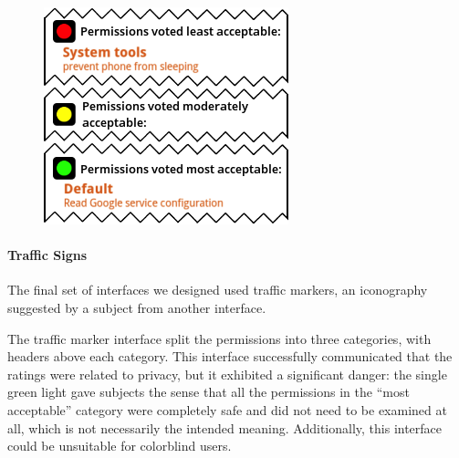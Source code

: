 \documentclass[11pt]{article}
\begin{document}
\newpage

\begin{figure}
\begin{center}
\includegraphics[width=.9\linewidth]{candidate-img/traffic/trafficR2.png}
\end{center}
\end{figure}

\paragraph{Traffic Signs}
\label{s-sec-traffic}

The final set of interfaces we designed used traffic markers, 
an iconography suggested by a subject from another interface.

\label{ss-sec-traffic-r2}

The traffic marker interface split the permissions into three categories, with headers above
each category.
This interface successfully communicated that the ratings were related to privacy, 
but it exhibited a significant danger: the single green light gave subjects
the sense that all the permissions in the ``most acceptable'' category were 
completely safe and did
not need to be examined at all, which is not necessarily the
intended meaning. Additionally, this interface 
could be unsuitable for colorblind users.
\end{document}
